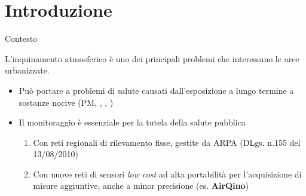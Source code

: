 \section{Introduzione}
\begin{frame}{Contesto}

L’inquinamento atmosferico è uno dei principali problemi che interessano le aree urbanizzate.
\vspace{0.3cm}
\begin{itemize}
 \item Può portare a problemi di salute causati dall’esposizione a lungo termine a sostanze nocive (PM, , , )\vspace{0.3cm}
 \item Il monitoraggio è essenziale per la tutela della salute pubblica\vspace{0.1cm}
 \begin{enumerate}
 \item Con reti regionali di rilevamento fisse, gestite da ARPA (DLgs. n.155 del 13/08/2010)\vspace{0.1cm}
 \item Con nuove reti di sensori \textit{low cost} ad alta portabilità per l'acquisizione di misure aggiuntive, anche a minor precisione (es. \textbf{AirQino})
\end{enumerate}
\end{itemize}

\end{frame}

